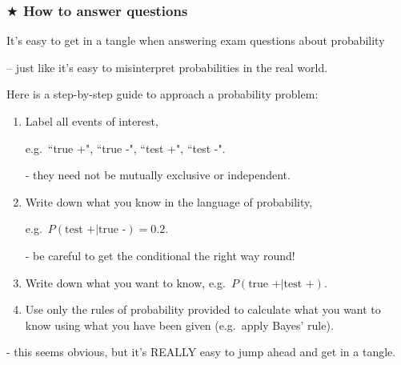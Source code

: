 \documentclass[t,8pt]{beamer}
\begin{document}
\begin{frame}
	\frametitle{$\bigstar$ How to answer questions}
	It's easy to get in a tangle when answering exam questions about probability \par
	– just like it's easy to misinterpret probabilities in the real world. \par
	Here is a step-by-step guide to approach a probability problem:
	\begin{enumerate}
		\item Label all events of interest, \par
		e.g.\ ``true +", ``true -", ``test +", ``test -". \par
		{\small\color{NavyBlue} - they need not be mutually exclusive or independent.}
		\item Write down what you know in the language of probability, \par
		e.g.\ $P(\text{test +}\vert \text{true -})=0.2$. \par
		{\small\color{NavyBlue} - be careful to get the conditional the right way round!}
		\item Write down what you want to know, e.g.\ $P(\text{true +}\vert \text{test +})$.
		\item Use only the rules of probability provided to calculate what you want to know using what you have been given (e.g.\ apply Bayes' rule).
	\end{enumerate}
	{\small\color{NavyBlue} - this seems obvious, but it's REALLY easy to jump ahead and get in a tangle.}
\end{frame}
\end{document}
